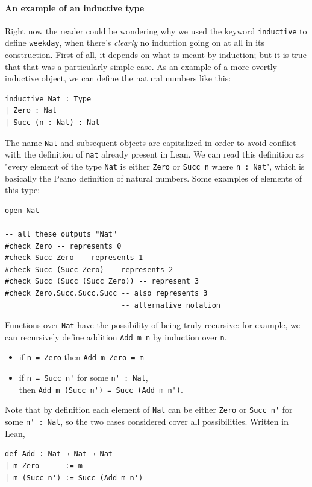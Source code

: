 \documentclass{book}
\theoremstyle{definition}
\theoremstyle{remark}
\theoremstyle{plain}
\begin{document}
\paragraph{An example of an inductive type}
Right now the reader could be wondering why we used the keyword \lstinline{inductive} to define \lstinline{weekday},
when there's \textit{clearly} no induction going on at all in its construction.
First of all, it depends on what is meant by induction; but it is true that that was a particularly simple case.
As an example of a more overtly inductive object, we can define the natural numbers like this:
\begin{lstlisting}
inductive Nat : Type
| Zero : Nat
| Succ (n : Nat) : Nat
\end{lstlisting}
The name \lstinline{Nat} and subsequent objects are capitalized in order to avoid conflict with the definition of \lstinline{nat} already present in Lean.
We can read this definition as "every element of the type \lstinline{Nat} is either \lstinline{Zero}
or \lstinline{Succ n} where \lstinline{n : Nat}",
which is basically the Peano definition of natural numbers.
Some examples of elements of this type:
\begin{lstlisting}
open Nat

-- all these outputs "Nat"
#check Zero -- represents 0
#check Succ Zero -- represents 1
#check Succ (Succ Zero) -- represents 2
#check Succ (Succ (Succ Zero)) -- represent 3
#check Zero.Succ.Succ.Succ -- also represents 3
                           -- alternative notation
\end{lstlisting}
Functions over \lstinline{Nat} have the possibility of being truly recursive:
for example, we can recursively define addition \lstinline{Add m n} by induction over \lstinline{n}.
\begin{itemize}
\item if \lstinline{n = Zero} then \lstinline{Add m Zero = m}
\item if \lstinline{n = Succ n'} for some \lstinline{n' : Nat}, \\
      then \lstinline{Add m (Succ n') = Succ (Add m n')}.
\end{itemize}
Note that by definition each element of \lstinline{Nat} can be either \lstinline{Zero} or \lstinline{Succ n'} for some \lstinline{n' : Nat},
so the two cases considered cover all possibilities.
Written in Lean,
\begin{lstlisting}
def Add : Nat → Nat → Nat
| m Zero      := m
| m (Succ n') := Succ (Add m n')
\end{lstlisting}
\end{document}
